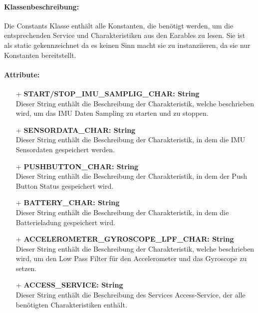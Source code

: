 \documentclass[a4paper,12pt]{article}
\begin{document}
\paragraph{Klassenbeschreibung:}
Die Constants Klasse enthält alle Konstanten, die benötigt werden, um die entsprechenden Service und Charakteristiken aus den \Gls{Earables} zu lesen. Sie ist als static gekennzeichnet da es keinen Sinn macht sie zu instanziieren, da sie nur Konstanten bereitstellt.

\paragraph{Attribute:}
\begin{itemize}
	\item[+] \textbf{START/STOP\_IMU\_SAMPLIG\_CHAR: String}\\Dieser String enthält die Beschreibung der Charakteristik, welche beschrieben wird,  um das IMU Daten Sampling zu starten und zu stoppen.
	\item[+] \textbf{SENSORDATA\_CHAR: String}\\Dieser String enthält die Beschreibung der Charakteristik, in dem die IMU Sensordaten gespeichert werden.
	\item[+] \textbf{PUSHBUTTON\_CHAR: String}\\Dieser String enthält die Beschreibung der Charakteristik, in dem der Push Button Status gespeichert wird.
	\item[+] \textbf{BATTERY\_CHAR: String}\\Dieser String enthält die Beschreibung der Charakteristik, in dem die Batterieladung gespeichert wird.
	\item[+] \textbf{ACCELEROMETER\_GYROSCOPE\_LPF\_CHAR: String}\\Dieser String enthält die Beschreibung der Charakteristik, welche beschrieben wird, um den Low Pass Filter für den Accelerometer und das Gyroscope zu setzen.
\item[+] \textbf{ACCESS\_SERVICE: String}\\Dieser String enthält die Beschreibung des Services Access-Service, der alle benötigten Charakteristiken enthält.
\end{itemize}
\end{document}
